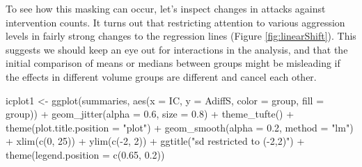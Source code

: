 \documentclass[
  10pt,
  dvipsnames, enabledeprecatedfontcommands]{scrartcl}
\newenvironment{Shaded}{\begin{snugshade}}{\end{snugshade}}
\newcommand{\AttributeTok}[1]{\textcolor[rgb]{0.77,0.63,0.00}{#1}}
\newcommand{\DecValTok}[1]{\textcolor[rgb]{0.00,0.00,0.81}{#1}}
\newcommand{\FloatTok}[1]{\textcolor[rgb]{0.00,0.00,0.81}{#1}}
\newcommand{\FunctionTok}[1]{\textcolor[rgb]{0.00,0.00,0.00}{#1}}
\newcommand{\NormalTok}[1]{#1}
\newcommand{\OtherTok}[1]{\textcolor[rgb]{0.56,0.35,0.01}{#1}}
\newcommand{\SpecialCharTok}[1]{\textcolor[rgb]{0.00,0.00,0.00}{#1}}
\newcommand{\StringTok}[1]{\textcolor[rgb]{0.31,0.60,0.02}{#1}}
\begin{document}
To see how this masking can occur, let's inspect changes in attacks
against intervention counts. It turns out that restricting attention to
various aggression levels in fairly strong changes to the regression
lines (Figure \ref{fig:linearShift}). This suggests we should keep an
eye out for interactions in the analysis, and that the initial
comparison of means or medians between groups might be misleading if the
effects in different volume groups are different and cancel each other.

\vspace{1mm}
\footnotesize

\begin{Shaded}
\begin{Highlighting}[]
\NormalTok{icplot1 }\OtherTok{\textless{}{-}} \FunctionTok{ggplot}\NormalTok{(summaries, }\FunctionTok{aes}\NormalTok{(}\AttributeTok{x =}\NormalTok{ IC, }\AttributeTok{y =}\NormalTok{ AdiffS, }\AttributeTok{color =}\NormalTok{ group, }\AttributeTok{fill =}\NormalTok{ group)) }\SpecialCharTok{+}
    \FunctionTok{geom\_jitter}\NormalTok{(}\AttributeTok{alpha =} \FloatTok{0.6}\NormalTok{, }\AttributeTok{size =} \FloatTok{0.8}\NormalTok{) }\SpecialCharTok{+} \FunctionTok{theme\_tufte}\NormalTok{() }\SpecialCharTok{+} \FunctionTok{theme}\NormalTok{(}\AttributeTok{plot.title.position =} \StringTok{"plot"}\NormalTok{) }\SpecialCharTok{+}
    \FunctionTok{geom\_smooth}\NormalTok{(}\AttributeTok{alpha =} \FloatTok{0.2}\NormalTok{, }\AttributeTok{method =} \StringTok{"lm"}\NormalTok{) }\SpecialCharTok{+} \FunctionTok{xlim}\NormalTok{(}\FunctionTok{c}\NormalTok{(}\DecValTok{0}\NormalTok{, }\DecValTok{25}\NormalTok{)) }\SpecialCharTok{+} \FunctionTok{ylim}\NormalTok{(}\FunctionTok{c}\NormalTok{(}\SpecialCharTok{{-}}\DecValTok{2}\NormalTok{,}
    \DecValTok{2}\NormalTok{)) }\SpecialCharTok{+} \FunctionTok{ggtitle}\NormalTok{(}\StringTok{"sd restricted to ({-}2,2)"}\NormalTok{) }\SpecialCharTok{+} \FunctionTok{theme}\NormalTok{(}\AttributeTok{legend.position =} \FunctionTok{c}\NormalTok{(}\FloatTok{0.65}\NormalTok{,}
    \FloatTok{0.2}\NormalTok{))}


\end{Highlighting}
\end{Shaded}
\end{document}
